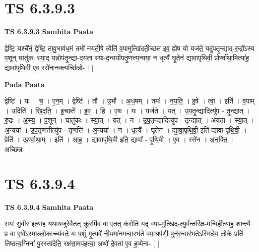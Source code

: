 \documentclass[17pt]{extarticle}
\begin{document}

\section{ TS 6.3.9.3 }

\textbf{TS 6.3.9.3 } \newline
\textbf{Samhita Paata} \newline

द्वेष्टि॒ यश्चै॑नं॒ द्वेष्टि॒ तावु॒भाव॑ध॒मं तमो॑ नयती॒षे त्वेति॑ व॒पामुत्खि॑दती॒च्छत॑ इव॒ ह्ये॑ष यो यज॑ते॒ यदु॑पतृ॒न्द्याद्-रु॒द्रो᳚ऽस्य प॒शून् घातु॑कः स्या॒द् यन्नोप॑तृ॒न्द्या-दय॑ता स्या-द॒न्ययो॑पतृ॒णत्त्य॒न्यया॒ न धृत्यै॑ घृ॒तेन॑ द्यावापृथिवी॒ प्रोर्ण्वा॑था॒मित्या॑ह॒ द्यावा॑पृथि॒वी ए॒व रसे॑नान॒क्त्यच्छि॑न्नो॒- [  ] \newline

\textbf{Pada Paata} \newline

द्वेष्टि॑ । यः । च॒ । ए॒न॒म् । द्वेष्टि॑ । तौ । उ॒भौ । अ॒ध॒मम् । तमः॑ । न॒य॒ति॒ । इ॒षे । त्वा॒ । इति॑ । व॒पाम् । उदिति॑ । खि॒द॒ति॒ । इ॒च्छते᳚ । इ॒व॒ । हि । ए॒षः । यः । यज॑ते । यत् । उ॒प॒तृ॒न्द्यादित्यु॑प - तृ॒न्द्यात् । रु॒द्रः । अ॒स्य॒ । प॒शून् । घातु॑कः । स्या॒त् । यत् । न । उ॒प॒तृ॒न्द्यादित्यु॑प - तृ॒न्द्यात् । अय॑ता । स्या॒त् । अ॒न्यया᳚ । उ॒प॒तृ॒णत्तीत्यु॑प - तृ॒णत्ति॑ । अ॒न्यया᳚ । न । धृत्यै᳚ । घृ॒तेन॑ । द्या॒वा॒पृ॒थि॒वी॒ इति॑ द्यावा-पृ॒थि॒वी॒ । प्रेति॑ । ऊ॒र्ण्वा॒था॒म् । इति॑ । आ॒ह॒ । द्यावा॑पृथि॒वी इति॒ द्यावा᳚ - पृ॒थि॒वी । ए॒व । रसे॑न । अ॒न॒क्ति॒ । अच्छि॑न्नः ।  \newline





\section{ TS 6.3.9.4 }

\textbf{TS 6.3.9.4 } \newline
\textbf{Samhita Paata} \newline

रायः॑ सु॒वीर॒ इत्या॑ह यथाय॒जुरे॒वैतत् क्रू॒रमि॑व॒ वा ए॒तत् क॑रोति॒ यद् व॒पा-मु॑त्खि॒द-त्यु॒र्व॑न्तरि॑क्ष॒-मन्वि॒हीत्या॑ह॒ शान्त्यै॒ प्र वा ए॒षो᳚ऽस्माल्लो॒काच्च्य॑वते॒ यः प॒शुं मृ॒त्यवे॑ नी॒यमा॑नमन्वा॒रभ॑ते वपा॒श्रप॑णी॒ पुन॑र॒न्वार॑भते॒ऽस्मिन्ने॒व लो॒के प्रति॑ तिष्ठत्य॒ग्निना॑ पु॒रस्ता॑देति॒ रक्ष॑सा॒मप॑हत्या॒ अथो॑ दे॒वता॑ ए॒व ह॒व्येना- [  ] \newline
\end{document}

